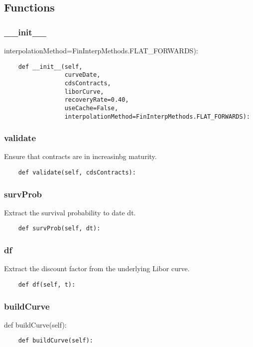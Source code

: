 \documentclass[twoside,11pt]{book}
\begin{document}
\subsection*{Functions}

\subsubsection*{{\bf \_\_init\_\_}}
interpolationMethod=FinInterpMethods.FLAT\_FORWARDS): 

\begin{lstlisting}
    def __init__(self,
                 curveDate,
                 cdsContracts,
                 liborCurve,
                 recoveryRate=0.40,
                 useCache=False,
                 interpolationMethod=FinInterpMethods.FLAT_FORWARDS):
\end{lstlisting}

\subsubsection*{{\bf validate}}
Ensure that contracts are in increasinbg maturity.  

\begin{lstlisting}
    def validate(self, cdsContracts):
\end{lstlisting}

\subsubsection*{{\bf survProb}}
Extract the survival probability to date dt.  

\begin{lstlisting}
    def survProb(self, dt):
\end{lstlisting}

\subsubsection*{{\bf df}}
Extract the discount factor from the underlying Libor curve.  

\begin{lstlisting}
    def df(self, t):
\end{lstlisting}

\subsubsection*{{\bf buildCurve}}
def buildCurve(self): 

\begin{lstlisting}
    def buildCurve(self):
\end{lstlisting}
\end{document}
